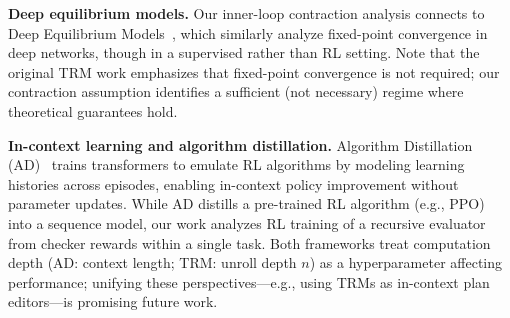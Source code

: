 \documentclass{article}
\theoremstyle{plain}
\theoremstyle{definition}
\theoremstyle{remark}
\begin{document}
{\textbf{Deep equilibrium models.}
Our inner-loop contraction analysis connects to Deep Equilibrium Models~\citep{Bai2019DEQ}, which similarly analyze fixed-point convergence in deep networks, though in a supervised rather than RL setting. Note that the original TRM work emphasizes that fixed-point convergence is not required; our contraction assumption identifies a sufficient (not necessary) regime where theoretical guarantees hold.

\textbf{In-context learning and algorithm distillation.} Algorithm Distillation (AD)~\citep{laskin2022context} trains transformers to emulate RL algorithms by modeling learning histories across episodes, enabling in-context policy improvement without parameter updates. While AD distills a pre-trained RL algorithm (e.g., PPO) into a sequence model, our work analyzes RL training of a recursive evaluator from checker rewards within a single task. Both frameworks treat computation depth (AD: context length; TRM: unroll depth $n$) as a hyperparameter affecting performance; unifying these perspectives---e.g., using TRMs as in-context plan editors---is promising future work.}
\end{document}
